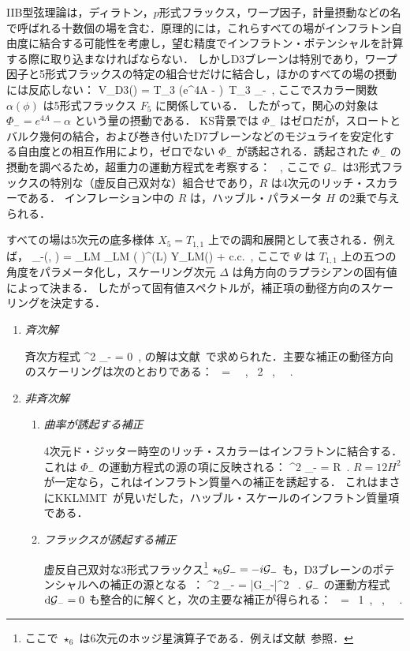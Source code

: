 IIB型弦理論は，ディラトン，$p$形式フラックス，ワープ因子，計量摂動などの名で呼ばれる十数個の場を含む．原理的には，これらすべての場がインフラトン自由度に結合する可能性を考慮し，望む精度でインフラトン・ポテンシャルを計算する際に取り込まなければならない．
しかしD3ブレーンは特別であり，ワープ因子と5形式フラックスの特定の組合せだけに結合し，ほかのすべての場の摂動には反応しない：
\beq
V_{\rm D3}(\phi) = T_3 (e^{4A} - \alpha)\ \equiv T_3 \Phi_-\, ,
\eeq
ここでスカラー関数 $\alpha(\phi)$ は5形式フラックス $F_5$ に関係している．
したがって，関心の対象は $\Phi_- =  e^{4A}-\alpha$ という量の摂動である．
KS背景では $\Phi_- $ はゼロだが，スロートとバルク幾何の結合，および巻き付いたD7ブレーンなどのモジュライを安定化する自由度との相互作用により，ゼロでない $\Phi_-$ が誘起される．誘起された $\Phi_-$ の摂動を調べるため，超重力の運動方程式を考察する：
\beq
\label{equ:Phim}
\, ,
\eeq
ここで ${\cal G}_-$ は3形式フラックスの特別な（虚反自己双対な）組合せであり，$R$ は4次元のリッチ・スカラーである．
インフレーション中の $R$ は，ハッブル・パラメータ $H$ の2乗で与えられる．

すべての場は5次元の底多様体 $X_5 = T_{1,1}$ 上での調和展開として表される．例えば，
\beq
\Phi_-(\phi, \Psi) = \sum_{LM} \Phi_{LM} \left(  \right)^{\Delta(L)} Y_{LM}(\Psi) + c.c.\, ,
\eeq
ここで $\Psi$ は $T_{1,1}$ 上の五つの角度をパラメータ化し，スケーリング次元 $\Delta$ は角方向のラプラシアンの固有値によって決まる．
したがって固有値スペクトルが，補正項の動径方向のスケーリングを決定する．

\begin{enumerate}
\item {\it 斉次解}

斉次方程式
\beq
\nabla^2 \Phi_- = 0\, ,
\eeq
の解は文献~\cite{Baumann:2008kq}で求められた．主要な補正の動径方向のスケーリングは次のとおりである：
\beq
\Delta \ = \ \, , \, 2 \, ,  \ \cdots \ .
\eeq

\item {\it 非斉次解}
\begin{enumerate}
\item {\it 曲率が誘起する補正}

4次元ド・ジッター時空のリッチ・スカラーはインフラトンに結合する．
これは $\Phi_-$ の運動方程式の源の項に反映される：
\beq
\nabla^2 \Phi_- =  R\, .
\eeq
$R = 12 H^2$ が一定なら，これはインフラトン質量への補正を誘起する．
これはまさにKKLMMT~\cite{KKLMMT}が見いだした，ハッブル・スケールのインフラトン質量項である．

\item {\it フラックスが誘起する補正}

虚反自己双対な3形式フラックス\footnote{ここで $\star_6$ は6次元のホッジ星演算子である．例えば文献~\cite{Nakahara}参照．} $\star_6 {\cal G}_- = - i {\cal G}_-$ も，D3ブレーンのポテンシャルへの補正の源となる~\cite{BaumannProgress}：
\beq
\nabla^2 \Phi_- =  |{\cal G}_-|^2 \, .
\eeq
${\cal G}_-$ の運動方程式 ${\rm d} {\cal G}_-= 0$ も整合的に解くと，次の主要な補正が得られる：
\beq
\Delta \ = \ 1\, ,  \, ,  \ \cdots \ .
\eeq
\end{enumerate}
\end{enumerate}

